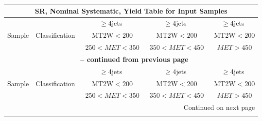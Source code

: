 \documentclass{article}
\begin{document}
\begin{longtable}{|l|c|c|c|c|} 
 
\multicolumn{5}{c}{ SR, Nominal Systematic, Yield Table for Input Samples }\\* \hline 
 &  & $\ge$4jets  & $\ge$4jets  & $\ge$4jets \\* 
Sample & Classification  & ~MT2W$<200$  & ~MT2W$<200$  & ~MT2W$<200$ \\* 
 &  & ~$250<MET<350$  & ~$350<MET<450$  & ~$MET>450$ \\* 
\hline \hline 
\endfirsthead 
 
\multicolumn{5}{c}{{\bfseries \tablename\ \thetable{} -- continued from previous page}}\\* \hline 
 &  & $\ge$4jets  & $\ge$4jets  & $\ge$4jets \\* 
Sample & Classification  & ~MT2W$<200$  & ~MT2W$<200$  & ~MT2W$<200$ \\* 
 &  & ~$250<MET<350$  & ~$350<MET<450$  & ~$MET>450$ \\* 
\hline \hline 
\endhead 
 
\multicolumn{5}{|r|}{{Continued on next page}}\\* \hline 
\endfoot 
 
 
\endlastfoot 
 

\end{longtable}
\end{document}
